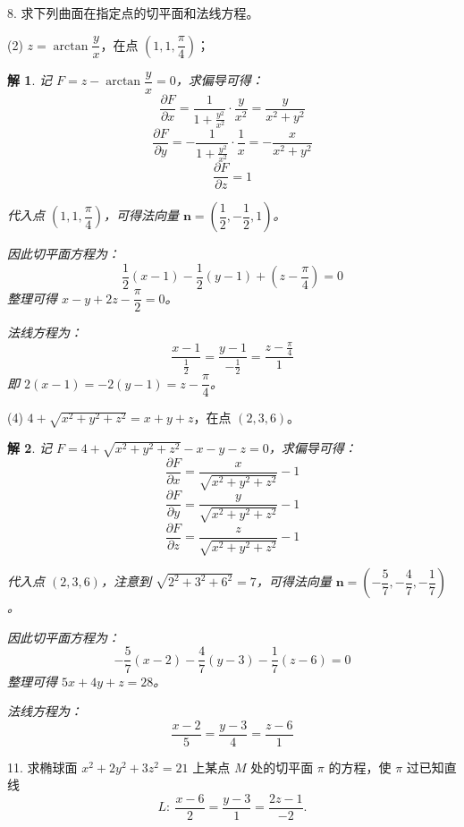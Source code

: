 \documentclass[a4paper,12pt]{article}
\newtheorem*{sol}{解}
\begin{document}
8. 求下列曲面在指定点的切平面和法线方程。

(2) $z=\arctan\dfrac{y}{x}$，在点 $\left(1,1,\dfrac{\pi}{4}\right)$；

\begin{sol}
    记 $F=z-\arctan\dfrac{y}{x}=0$，求偏导可得：
    $$\frac{\partial F}{\partial x}=\frac{1}{1+\frac{y^2}{x^2}}\cdot\frac{y}{x^2}=\frac{y}{x^2+y^2}$$
    $$\frac{\partial F}{\partial y}=-\frac{1}{1+\frac{y^2}{x^2}}\cdot\frac{1}{x}=-\frac{x}{x^2+y^2}$$
    $$\frac{\partial F}{\partial z}=1$$

    代入点 $\left(1,1,\dfrac{\pi}{4}\right)$，可得法向量 $\boldsymbol{n}=\left(\dfrac{1}{2},-\dfrac{1}{2},1\right)$。

    因此切平面方程为：
    $$\frac{1}{2}(x-1)-\frac{1}{2}(y-1)+\left(z-\frac{\pi}{4}\right)=0$$
    整理可得 $x-y+2z-\dfrac{\pi}{2}=0$。

    法线方程为：
    $$\frac{x-1}{\frac{1}{2}}=\frac{y-1}{-\frac{1}{2}}=\frac{z-\frac{\pi}{4}}{1}$$
    即 $2(x-1)=-2(y-1)=z-\dfrac{\pi}{4}$。
\end{sol}

(4) $4+\sqrt{x^2+y^2+z^2}=x+y+z$，在点 $(2,3,6)$。

\begin{sol}
    记 $F=4+\sqrt{x^2+y^2+z^2}-x-y-z=0$，求偏导可得：
    $$\frac{\partial F}{\partial x}=\frac{x}{\sqrt{x^2+y^2+z^2}}-1$$
    $$\frac{\partial F}{\partial y}=\frac{y}{\sqrt{x^2+y^2+z^2}}-1$$
    $$\frac{\partial F}{\partial z}=\frac{z}{\sqrt{x^2+y^2+z^2}}-1$$

    代入点 $(2,3,6)$，注意到 $\sqrt{2^2+3^2+6^2}=7$，可得法向量 $\boldsymbol{n}=\left(-\dfrac{5}{7},-\dfrac{4}{7},-\dfrac{1}{7}\right)$。

    因此切平面方程为：
    $$-\frac{5}{7}(x-2)-\frac{4}{7}(y-3)-\frac{1}{7}(z-6)=0$$
    整理可得 $5x+4y+z=28$。

    法线方程为：
    $$\frac{x-2}{5}=\frac{y-3}{4}=\frac{z-6}{1}$$
\end{sol}

11. 求椭球面 $x^2+2y^2+3z^2=21$ 上某点 $M$ 处的切平面 $\pi$ 的方程，使 $\pi$ 过已知直线
$$
    L:\ \frac{x-6}{2}=\frac{y-3}{1}=\frac{2z-1}{-2}.
$$
\end{document}

